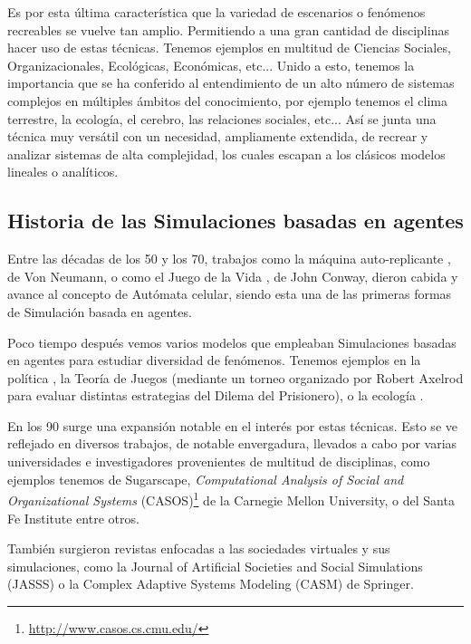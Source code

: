 Es por esta última característica que la variedad de escenarios o fenómenos recreables se vuelve tan amplio. Permitiendo a una gran cantidad de disciplinas hacer uso de estas técnicas. Tenemos ejemplos en multitud de Ciencias Sociales, Organizacionales, Ecológicas, Económicas, etc...
Unido a esto, tenemos la importancia que se ha conferido al entendimiento de un alto número de sistemas complejos en múltiples ámbitos del conocimiento, por ejemplo tenemos el clima terrestre, la ecología, el cerebro, las relaciones sociales, etc...
Así se junta una técnica muy versátil con un necesidad, ampliamente extendida, de recrear y analizar sistemas de alta complejidad, los cuales escapan a los clásicos modelos lineales o analíticos.

\subsection{Historia de las Simulaciones basadas en agentes}

Entre las décadas de los 50 y los 70, trabajos como la máquina auto-replicante \citep{neumann1966theory} , de Von Neumann, o como el Juego de la Vida \citep{gardner1970fantastic}, de John Conway, dieron cabida y avance al concepto de Autómata celular, siendo esta una de las primeras formas de Simulación basada en agentes.

Poco tiempo después vemos varios modelos que empleaban Simulaciones basadas en agentes para estudiar diversidad de fenómenos. Tenemos ejemplos en la política \citep{schelling1971dynamic}, la Teoría de Juegos (mediante un torneo organizado por Robert Axelrod para evaluar distintas estrategias del Dilema del Prisionero), o la ecología \citep{hogeweg1983ontogeny}.

En los 90 surge una expansión notable en el interés por estas técnicas. Esto se ve reflejado en diversos trabajos, de notable envergadura, llevados a cabo por varias universidades e investigadores provenientes de multitud de disciplinas, como ejemplos tenemos \cite{epstein1996growing} de Sugarscape, \textit{Computational Analysis of Social and Organizational Systems} (CASOS)\footnote{\url{http://www.casos.cs.cmu.edu/}} de la Carnegie Mellon University, o \cite{kohler2000dynamics} del Santa Fe Institute  entre otros.

También surgieron revistas enfocadas a las sociedades virtuales y sus simulaciones, como la Journal of Artificial Societies and Social Simulations (JASSS) o la Complex Adaptive Systems Modeling (CASM) de Springer.

